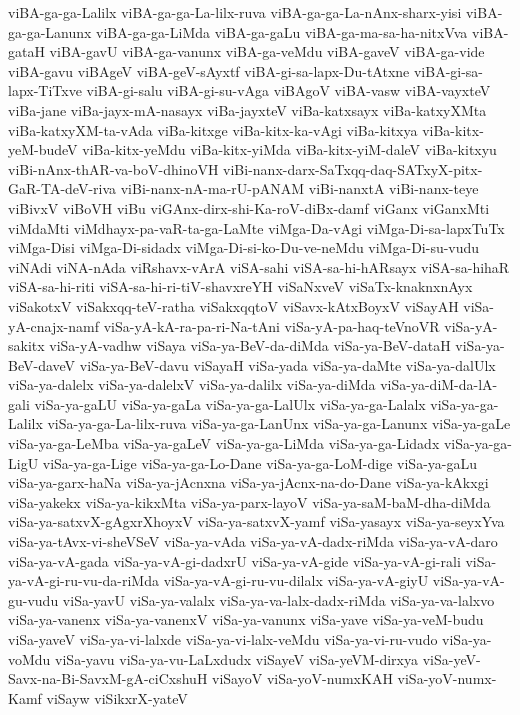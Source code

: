 {viBA-ga-ga-Lalilx
viBA-ga-ga-La-lilx-ruva
viBA-ga-ga-La-nAnx-sharx-yisi
viBA-ga-ga-Lanunx
viBA-ga-ga-LiMda
viBA-ga-gaLu
viBA-ga-ma-sa-ha-nitxVva
viBA-gataH
viBA-gavU
viBA-ga-vanunx
viBA-ga-veMdu
viBA-gaveV
viBA-ga-vide
viBA-gavu
viBAgeV
viBA-geV-sAyxtf
viBA-gi-sa-lapx-Du-tAtxne
viBA-gi-sa-lapx-TiTxve
viBA-gi-salu
viBA-gi-su-vAga
viBAgoV
viBA-vasw
viBA-vayxteV
viBa-jane
viBa-jayx-mA-nasayx
viBa-jayxteV
viBa-katxsayx
viBa-katxyXMta
viBa-katxyXM-ta-vAda
viBa-kitxge
viBa-kitx-ka-vAgi
viBa-kitxya
viBa-kitx-yeM-budeV
viBa-kitx-yeMdu
viBa-kitx-yiMda
viBa-kitx-yiM-daleV
viBa-kitxyu
viBi-nAnx-thAR-va-boV-dhinoVH
viBi-nanx-darx-SaTxqq-daq-SATxyX-pitx-GaR-TA-deV-riva
viBi-nanx-nA-ma-rU-pANAM
viBi-nanxtA
viBi-nanx-teye
viBivxV
viBoVH
viBu
viGAnx-dirx-shi-Ka-roV-diBx-damf
viGanx
viGanxMti
viMdaMti
viMdhayx-pa-vaR-ta-ga-LaMte
viMga-Da-vAgi
viMga-Di-sa-lapxTuTx
viMga-Disi
viMga-Di-sidadx
viMga-Di-si-ko-Du-ve-neMdu
viMga-Di-su-vudu
viNAdi
viNA-nAda
viRshavx-vArA
viSA-sahi
viSA-sa-hi-hARsayx
viSA-sa-hihaR
viSA-sa-hi-riti
viSA-sa-hi-ri-tiV-shavxreYH
viSaNxveV
viSaTx-knaknxnAyx
viSakotxV
viSakxqq-teV-ratha
viSakxqqtoV
viSavx-kAtxBoyxV
viSayAH
viSa-yA-cnajx-namf
viSa-yA-kA-ra-pa-ri-Na-tAni
viSa-yA-pa-haq-teVnoVR
viSa-yA-sakitx
viSa-yA-vadhw
viSaya
viSa-ya-BeV-da-diMda
viSa-ya-BeV-dataH
viSa-ya-BeV-daveV
viSa-ya-BeV-davu
viSayaH
viSa-yada
viSa-ya-daMte
viSa-ya-dalUlx
viSa-ya-dalelx
viSa-ya-dalelxV
viSa-ya-dalilx
viSa-ya-diMda
viSa-ya-diM-da-lA-gali
viSa-ya-gaLU
viSa-ya-gaLa
viSa-ya-ga-LalUlx
viSa-ya-ga-Lalalx
viSa-ya-ga-Lalilx
viSa-ya-ga-La-lilx-ruva
viSa-ya-ga-LanUnx
viSa-ya-ga-Lanunx
viSa-ya-gaLe
viSa-ya-ga-LeMba
viSa-ya-gaLeV
viSa-ya-ga-LiMda
viSa-ya-ga-Lidadx
viSa-ya-ga-LigU
viSa-ya-ga-Lige
viSa-ya-ga-Lo-Dane
viSa-ya-ga-LoM-dige
viSa-ya-gaLu
viSa-ya-garx-haNa
viSa-ya-jAcnxna
viSa-ya-jAcnx-na-do-Dane
viSa-ya-kAkxgi
viSa-yakekx
viSa-ya-kikxMta
viSa-ya-parx-layoV
viSa-ya-saM-baM-dha-diMda
viSa-ya-satxvX-gAgxrXhoyxV
viSa-ya-satxvX-yamf
viSa-yasayx
viSa-ya-seyxYva
viSa-ya-tAvx-vi-sheVSeV
viSa-ya-vAda
viSa-ya-vA-dadx-riMda
viSa-ya-vA-daro
viSa-ya-vA-gada
viSa-ya-vA-gi-dadxrU
viSa-ya-vA-gide
viSa-ya-vA-gi-rali
viSa-ya-vA-gi-ru-vu-da-riMda
viSa-ya-vA-gi-ru-vu-dilalx
viSa-ya-vA-giyU
viSa-ya-vA-gu-vudu
viSa-yavU
viSa-ya-valalx
viSa-ya-va-lalx-dadx-riMda
viSa-ya-va-lalxvo
viSa-ya-vanenx
viSa-ya-vanenxV
viSa-ya-vanunx
viSa-yave
viSa-ya-veM-budu
viSa-yaveV
viSa-ya-vi-lalxde
viSa-ya-vi-lalx-veMdu
viSa-ya-vi-ru-vudo
viSa-ya-voMdu
viSa-yavu
viSa-ya-vu-LaLxdudx
viSayeV
viSa-yeVM-dirxya
viSa-yeV-Savx-na-Bi-SavxM-gA-ciCxshuH
viSayoV
viSa-yoV-numxKAH
viSa-yoV-numx-Kamf
viSayw
viSikxrX-yateV
}
